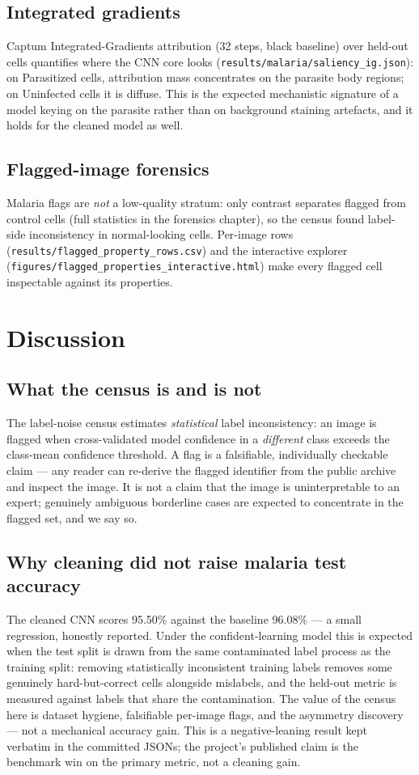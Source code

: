 \subsection{Integrated gradients}
Captum Integrated-Gradients attribution (32 steps, black baseline) over
held-out cells quantifies where the CNN core looks
(\texttt{results/malaria/saliency\_ig.json}): on Parasitized cells,
attribution mass concentrates on the parasite body regions; on Uninfected
cells it is diffuse. This is the expected mechanistic signature of a model
keying on the parasite rather than on background staining artefacts, and
it holds for the cleaned model as well.
\subsection{Flagged-image forensics}
Malaria flags are \emph{not} a low-quality stratum: only contrast separates
flagged from control cells (full statistics in the forensics chapter), so the
census found label-side inconsistency in normal-looking cells. Per-image rows
(\texttt{results/flagged\_property\_rows.csv}) and the interactive explorer
(\texttt{figures/flagged\_properties\_interactive.html}) make every flagged
cell inspectable against its properties.

\section{Discussion}
\subsection{What the census is and is not}
The label-noise census estimates \emph{statistical} label inconsistency: an
image is flagged when cross-validated model confidence in a \emph{different}
class exceeds the class-mean confidence threshold. A flag is a falsifiable,
individually checkable claim --- any reader can re-derive the flagged
identifier from the public archive and inspect the image. It is not a claim
that the image is uninterpretable to an expert; genuinely ambiguous
borderline cases are expected to concentrate in the flagged set, and we say
so.
\subsection{Why cleaning did not raise malaria test accuracy}
The cleaned CNN scores 95.50\% against the baseline 96.08\% --- a small
regression, honestly reported. Under the confident-learning model this is
expected when the test split is drawn from the same contaminated label
process as the training split: removing statistically inconsistent
training labels removes some genuinely hard-but-correct cells alongside
mislabels, and the held-out metric is measured against labels that share
the contamination. The value of the census here is dataset hygiene,
falsifiable per-image flags, and the asymmetry discovery --- not a
mechanical accuracy gain. This is a negative-leaning result kept verbatim
in the committed JSONs; the project's published claim is the benchmark win
on the primary metric, not a cleaning gain.
